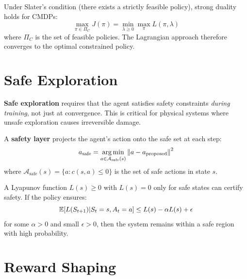 \begin{theorem}
Under Slater's condition (there exists a strictly feasible policy), strong
duality holds for CMDPs:
\[
    \max_{\pi \in \Pi_C} J(\pi) = \min_{\lambda \geq 0} \max_\pi L(\pi, \lambda)
\]
where $\Pi_C$ is the set of feasible policies. The Lagrangian approach
therefore converges to the optimal constrained policy.
\end{theorem}

\section{Safe Exploration}
\label{sec:safe_exploration}

\begin{definition}
\textbf{Safe exploration} requires that the agent satisfies safety
constraints \emph{during training}, not just at convergence. This is
critical for physical systems where unsafe exploration causes
irreversible damage.
\end{definition}

\begin{definition}
A \textbf{safety layer} projects the agent's action onto the safe set
at each step:
\[
    a_{\text{safe}} = \operatorname*{arg\,min}_{a \in \mathcal{A}_{\text{safe}}(s)}
    \left\| a - a_{\text{proposed}} \right\|^2
\]
where $\mathcal{A}_{\text{safe}}(s) = \{a : c(s,a) \leq 0\}$ is the
set of safe actions in state $s$.
\end{definition}

\begin{proposition}
A Lyapunov function $L(s) \geq 0$ with $L(s) = 0$ only for safe states
can certify safety. If the policy ensures:
\[
    \mathbb{E}[L(S_{t+1}) | S_t = s, A_t = a] \leq L(s) - \alpha L(s) + \epsilon
\]
for some $\alpha > 0$ and small $\epsilon > 0$, then the system remains
within a safe region with high probability.
\end{proposition}

\section{Reward Shaping}
\label{sec:reward_shaping}

